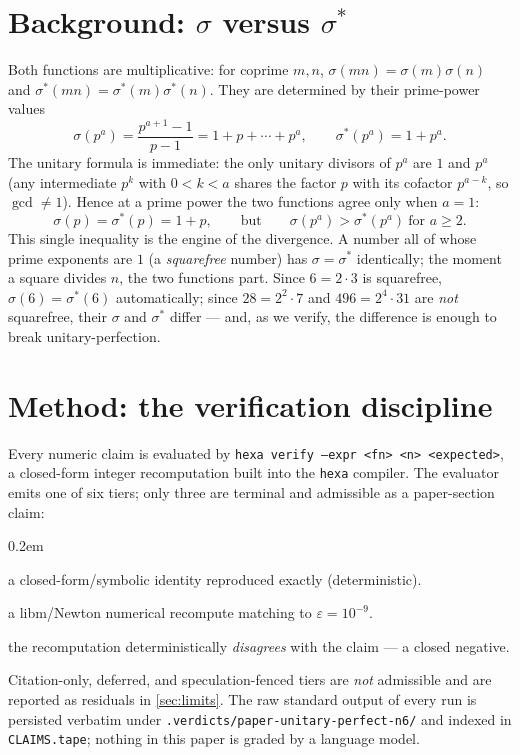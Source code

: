 \documentclass[11pt,a4paper]{article}
\newcommand{\sig}{\sigma}
\newcommand{\sigs}{\sigma^{*}}
\newcommand{\formal}{\textcolor{blue!60!black}{$\blacklozenge$}}
\newcommand{\falsi}{\textcolor{red!70!black}{$\blacksquare$}}
\theoremstyle{plain}
\theoremstyle{definition}
\begin{document}
\section{Background: \texorpdfstring{$\sig$}{sigma} versus \texorpdfstring{$\sigs$}{sigma-star}}
\label{sec:background}

Both functions are multiplicative: for coprime $m,n$, $\sig(mn)=\sig(m)\sig(n)$
and $\sigs(mn)=\sigs(m)\sigs(n)$. They are determined by their prime-power
values
\begin{equation}
  \sig(p^a)=\frac{p^{a+1}-1}{p-1}=1+p+\cdots+p^a,
  \qquad
  \sigs(p^a)=1+p^a .
  \label{eq:ppvals}
\end{equation}
The unitary formula is immediate: the only unitary divisors of $p^a$ are $1$ and
$p^a$ (any intermediate $p^k$ with $0<k<a$ shares the factor $p$ with its
cofactor $p^{a-k}$, so $\gcd\neq1$). Hence at a prime power the two functions
agree only when $a=1$:
\begin{equation}
  \sig(p)=\sigs(p)=1+p, \qquad\text{but}\qquad
  \sig(p^a)>\sigs(p^a)\ \text{for } a\ge2 .
  \label{eq:agree-disagree}
\end{equation}
This single inequality is the engine of the divergence. A number all of whose
prime exponents are $1$ (a \emph{squarefree} number) has $\sig=\sigs$
identically; the moment a square divides $n$, the two functions part. Since
$6=2\cdot3$ is squarefree, $\sig(6)=\sigs(6)$ automatically; since
$28=2^2\cdot7$ and $496=2^4\cdot31$ are \emph{not} squarefree, their $\sig$ and
$\sigs$ differ --- and, as we verify, the difference is enough to break
unitary-perfection.

\section{Method: the verification discipline}
\label{sec:method}

Every numeric claim is evaluated by \texttt{hexa verify --expr <fn> <n>
<expected>}, a closed-form integer recomputation built into the \texttt{hexa}
compiler. The evaluator emits one of six tiers; only three are terminal and
admissible as a paper-section claim:
\begin{description}\itemsep0.2em
\item[\formal\,\textsc{formal}] a closed-form/symbolic identity reproduced exactly (deterministic).
\item[\textcolor{green!50!black}{$\bullet$}\,\textsc{numerical}] a libm/Newton numerical recompute matching to $\varepsilon=10^{-9}$.
\item[\falsi\,\textsc{falsified}] the recomputation deterministically \emph{disagrees} with the claim --- a closed negative.
\end{description}
Citation-only, deferred, and speculation-fenced tiers are \emph{not} admissible
and are reported as residuals in \textsection\ref{sec:limits}. The raw standard
output of every run is persisted verbatim under
\texttt{.verdicts/paper-unitary-perfect-n6/} and indexed in
\texttt{CLAIMS.tape}; nothing in this paper is graded by a language model.
\end{document}
